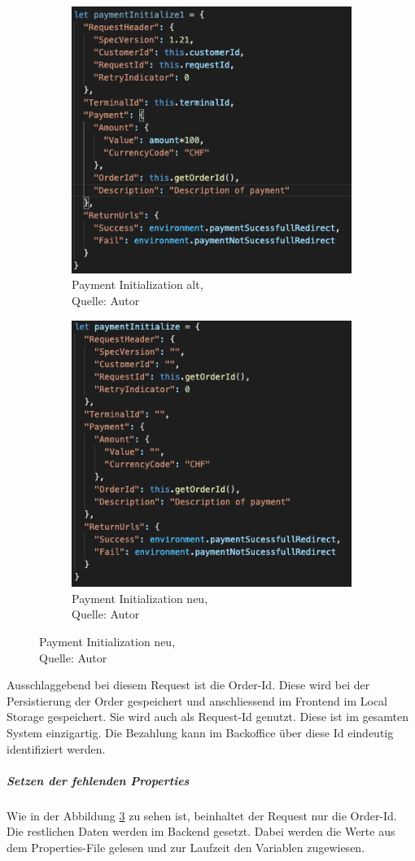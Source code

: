 \begin{figure}[H]
	\begin{subfigure}[b]{0.5\textwidth}
		\includegraphics[scale=0.5]{images/paymentOld.PNG}
		\caption[Payment Initialization alt]{Payment Initialization alt,\\ Quelle: Autor}
		\label{img: requestOld}
	\end{subfigure}
	\hfill
	\begin{subfigure}[b]{0.5\textwidth}
		\includegraphics[scale=0.5]{images/paymentNew.PNG}
		\caption[Payment Initialization neu]{Payment Initialization neu,\\ Quelle: Autor}
		\label{img: requestNew}
	\end{subfigure}
\end{figure} 
Ausschlaggebend bei diesem Request ist die Order-Id. Diese wird bei der Persistierung der Order gespeichert und anschliessend im Frontend im Local Storage gespeichert. Sie wird auch als Request-Id genutzt. Diese ist im gesamten System einzigartig. Die Bezahlung kann im Backoffice über diese Id eindeutig identifiziert werden. \\
\subparagraph{Setzen der fehlenden Properties}
Wie in der Abbildung \ref{img: requestNew} zu sehen ist, beinhaltet der Request nur die Order-Id. Die restlichen Daten werden im Backend gesetzt. Dabei werden die Werte aus dem Properties-File gelesen und zur Laufzeit den Variablen zugewiesen. 

